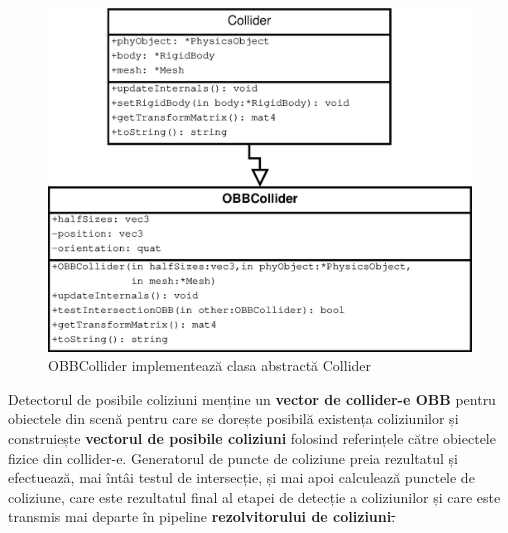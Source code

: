 \documentclass[12pt,a4paper]{report}
\providecommand{\DIFdeltex}[1]{{\protect\color{red}\sout{#1}}}                      %
\providecommand{\DIFdelbegin}{} %
\providecommand{\DIFaddbeginFL}{} %
\providecommand{\DIFaddendFL}{} %
\providecommand{\DIFdelbeginFL}{} %
\providecommand{\DIFdelendFL}{} %
\providecommand{\DIFdel}[1]{\texorpdfstring{\DIFdeltex{#1}}{}} %
\newcommand{\DIFscaledelfig}{0.5}
\newlength{\DIFdelgraphicswidth} %
\newlength{\DIFdelgraphicsheight} %
\newcommand{\DIFaddincludegraphics}[2][]{{\color{blue}\fbox{\DIFOincludegraphics[#1]{#2}}}} %
\newcommand{\DIFdelincludegraphics}[2][]{%
	\sbox{\DIFdelgraphicsbox}{\DIFOincludegraphics[#1]{#2}}%
	\settoboxwidth{\DIFdelgraphicswidth}{\DIFdelgraphicsbox} %
	\settoboxtotalheight{\DIFdelgraphicsheight}{\DIFdelgraphicsbox} %
	\scalebox{\DIFscaledelfig}{%
		\parbox[b]{\DIFdelgraphicswidth}{\usebox{\DIFdelgraphicsbox}\\[-\baselineskip] \rule{\DIFdelgraphicswidth}{0em}}\llap{\resizebox{\DIFdelgraphicswidth}{\DIFdelgraphicsheight}{%
				\setlength{\unitlength}{\DIFdelgraphicswidth}%
				\begin{picture}(1,1)%
				\thicklines\linethickness{2pt} %
				{\color[rgb]{1,0,0}\put(0,0){\framebox(1,1){}}}%
				{\color[rgb]{1,0,0}\put(0,0){\line( 1,1){1}}}%
				{\color[rgb]{1,0,0}\put(0,1){\line(1,-1){1}}}%
				\end{picture}%
			}\hspace*{3pt}}} %
} %
\DeclareRobustCommand{\DIFdelbegin}{\DIFOdelbegin \let\includegraphics\DIFdelincludegraphics} %
\DeclareRobustCommand{\DIFaddbeginFL}{\DIFOaddbeginFL \let\includegraphics\DIFaddincludegraphics} %
\DeclareRobustCommand{\DIFaddendFL}{\DIFOaddendFL \let\includegraphics\DIFOincludegraphics} %
\DeclareRobustCommand{\DIFdelbeginFL}{\DIFOdelbeginFL \let\includegraphics\DIFdelincludegraphics} %
\DeclareRobustCommand{\DIFdelendFL}{\DIFOaddendFL \let\includegraphics\DIFOincludegraphics} %
\begin{document}
	\begin{figure}[H]
		\centering
		\DIFdelbeginFL %
		\DIFdelendFL \DIFaddbeginFL \includegraphics[width=0.8\linewidth]{pics/collider.eps}
		\DIFaddendFL \caption[]{OBBCollider implementează clasa abstractă Collider}
		\label{fig:collider}
	\end{figure}
	
	Detectorul de posibile coliziuni menține un \textbf{vector de collider-e OBB} pentru obiectele din scenă pentru care se dorește posibilă existența coliziunilor și construiește \textbf{vectorul de posibile coliziuni} folosind referințele către obiectele fizice din collider-e. Generatorul de puncte de coliziune preia rezultatul și efectuează, mai întâi testul de intersecție, și mai apoi calculează punctele de coliziune, care este rezultatul final al etapei de detecție a coliziunilor și care este transmis mai departe în pipeline \textbf{rezolvitorului de coliziuni}\DIFdelbegin \DIFdel{.
	}%
	
\end{document}
